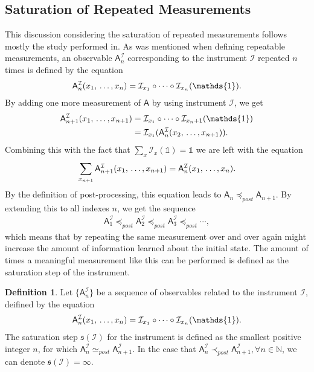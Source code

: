 \documentclass[a4paper,12pt]{wihuri}
\theoremstyle{definition}
\newtheorem{definition}{Definition}
\numberwithin{definition}{section}
\numberwithin{example}{section}
\numberwithin{theorem}{section}
\numberwithin{proposition}{section}
\numberwithin{lemma}{section}
\newcommand{\I}{\mathcal{I}}%
\newcommand{\A}{\mathsf{A}}%
\newcommand{\id}{\mathds{1}}
\newcommand{\sat}{\mathfrak{s}}
\newcommand{\pp}{\preceq_{post}}
\newcommand{\spp}{\simeq_{post}}
\newcommand{\ppeq}{\prec_{post}}
\begin{document}
\subsection{Saturation of Repeated Measurements}
This discussion considering the saturation of repeated measurements follows mostly the study performed in\cite{saturation}. 
As was mentioned when defining repeatable measurements, an observable $\A_n^\I$ corresponding to the instrument $\I$ repeated $n$ times is defined by the equation
\begin{align*}
\A_n^\I (x_1,\, \ldots ,x_n) = \I_{x_1} \circ \cdots \circ \I_{x_n}(\id)\text.
\end{align*}
By adding one more measurement of $\A$ by using instrument $\I$, we get
\begin{align*}
\A_{n+1}^\I(x_1, \,\ldots,x_{n+1}) &= \I_{x_1} \circ \cdots \circ \I_{x_n+1}(\id)\\
&=\I_{x_1}(\A_n^\I(x_2,\,\ldots,x_{n+1}))\text.
\end{align*}
Combining this with the fact that $\sum_x\I_x(\id) = \id$ we are left with the equation
\begin{align*}
\sum_{x_{n+1}}\A_{n+1}^\I(x_1, \,\ldots,x_{n+1}) = \A_n^\I(x_1,\,\ldots,x_n)\text.
\end{align*}
By the definition of post-processing, this equation leads to $\A_n \pp \A_{n+1}$. By extending this to all indexes $n$, we get the sequence
\begin{align*}
\A_1^\I \pp \A_2^\I \pp \A_3^\I \pp \cdots,
\end{align*}
which means that by repeating the same measurement over and over again might increase the amount of information learned about the initial state. The amount of times a meaningful measurement like this can be performed is defined as the saturation step of the instrument.


\begin{definition}
Let $\lbrace\A_n^\I\rbrace$ be a sequence of observables related to the instrument $\I$, deifined by the equation
\begin{align*}
\A_n^\I(x_1,\,\ldots,x_n) = \I_{x_1}\circ\cdots\circ\I_{x_n}(\id)\text.
\end{align*}
The saturation step $\sat(\I)$ for the instrument is defined as the smallest positive integer $n$, for which $\A_n^\I \spp \A_{n+1}^\I$. In the case that $\A_n^\I \ppeq \A_{n+1}^\I, \forall n \in \mathbb{N}$, we can denote $\sat(\I) = \infty$.
\end{definition}
\end{document}
